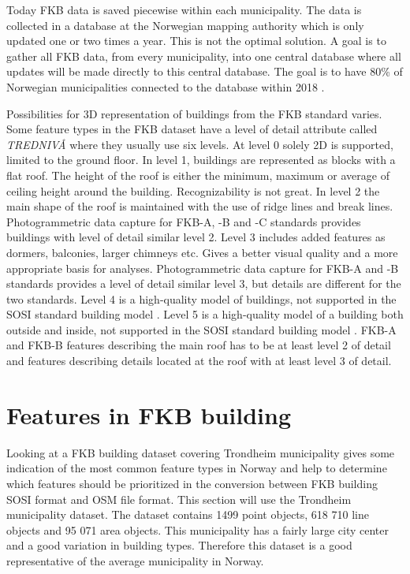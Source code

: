 Today FKB data is saved piecewise within each municipality. The data is collected in a database at the Norwegian mapping authority which is only updated one or two times a year. This is not the optimal solution. A goal is to gather all FKB data, from every municipality, into one central database where all updates will be made directly to this central database. The goal is to have 80\% of Norwegian municipalities connected to the database within 2018 \cite{Kartverket2016a}.  

Possibilities for 3D representation of buildings from the FKB standard varies. Some feature types in the FKB dataset have a level of detail attribute called \textit{TREDNIVÅ} where they usually use six levels. At level 0 solely 2D is supported, limited to the ground floor. In level 1, buildings are represented as blocks with a flat roof. The height of the roof is either the minimum, maximum or average of ceiling height around the building. Recognizability is not great. In level 2 the main shape of the roof is maintained with the use of ridge lines and break lines. Photogrammetric data capture for FKB-A, -B and -C standards provides buildings with level of detail similar level 2. Level 3 includes added features as dormers, balconies, larger chimneys etc. %
Gives a better visual quality and a more appropriate basis for analyses.  Photogrammetric data capture for FKB-A and -B standards provides a level of detail similar level 3, but details are different for the two standards. Level 4 is a high-quality model of buildings, not supported in the SOSI standard building model \cite{Kartverket}. Level 5 is a high-quality model of a building both outside and inside, not supported in the SOSI standard building model \cite{Kartverket}. FKB-A and FKB-B features describing the main roof has to be at least level 2 of detail and features describing details located at the roof with at least level 3 of detail. 

\section{Features in FKB building}\label{sec:FKBbuilding}
Looking at a FKB building dataset covering Trondheim municipality gives some indication of the most common feature types in Norway and help to determine which features should be prioritized in the conversion between FKB building SOSI format and OSM file format. This section will use the Trondheim municipality dataset. The dataset contains 1499 point objects, 618 710 line objects and 95 071 area objects. This municipality has a fairly large city center and a good variation in building types. %
Therefore this dataset is a good representative of the average municipality in Norway. 

